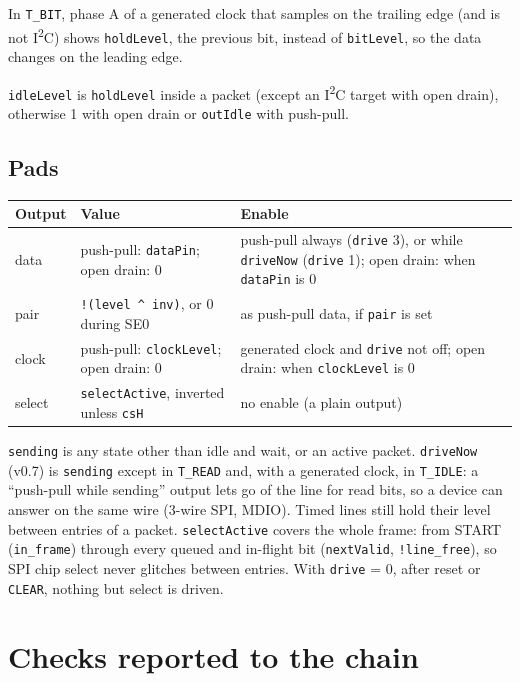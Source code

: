 \documentclass[11pt,a4paper]{article}
\newcommand{\sig}[1]{\texttt{#1}}
\begin{document}
In \sig{T\_BIT}, phase A of a generated clock that samples on the trailing edge (and is not I\textsuperscript{2}C) shows \sig{holdLevel}, the previous bit, instead of \sig{bitLevel}, so the data changes on the leading edge.

\sig{idleLevel} is \sig{holdLevel} inside a packet (except an I\textsuperscript{2}C target with open drain), otherwise 1 with open drain or \sig{outIdle} with push-pull.

\subsection{Pads}

\begin{center}
\begin{tabularx}{\linewidth}{@{}l L L@{}}
\toprule
Output & Value & Enable \\
\midrule
data & push-pull: \sig{dataPin}; open drain: 0 & push-pull always (\sig{drive} 3), or while \sig{driveNow} (\sig{drive} 1); open drain: when \sig{dataPin} is 0 \\
pair & \sig{!(level \^{} inv)}, or 0 during SE0 & as push-pull data, if \sig{pair} is set \\
clock & push-pull: \sig{clockLevel}; open drain: 0 & generated clock and \sig{drive} not off; open drain: when \sig{clockLevel} is 0 \\
select & \sig{selectActive}, inverted unless \sig{csH} & no enable (a plain output) \\
\bottomrule
\end{tabularx}
\end{center}

\sig{sending} is any state other than idle and wait, or an active packet. \sig{driveNow} (v0.7) is \sig{sending} except in \sig{T\_READ} and, with a generated clock, in \sig{T\_IDLE}: a ``push-pull while sending'' output lets go of the line for read bits, so a device can answer on the same wire (3-wire SPI, MDIO). Timed lines still hold their level between entries of a packet. \sig{selectActive} covers the whole frame: from START (\sig{in\_frame}) through every queued and in-flight bit (\sig{nextValid}, \sig{!line\_free}), so SPI chip select never glitches between entries. With \sig{drive} = 0, after reset or \sig{CLEAR}, nothing but select is driven.

\section{Checks reported to the chain}
\end{document}
